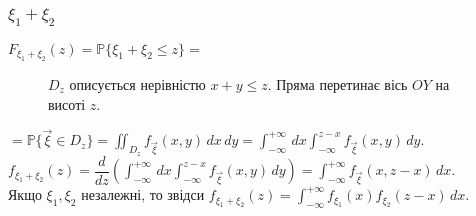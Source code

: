 \documentclass[a4paper, 10pt]{article}
\theoremstyle{theoremdd}
\begin{document}
\subsubsection{$\xi_1+\xi_2$}
$F_{\xi_1+\xi_2}(z) = \mathbb{P}\{\xi_1+\xi_2 \leq z\} =$
\begin{figure}[H]
\centering
{}
\caption*{$D_z$ описується нерівністю $x+y \leq z$. Пряма перетинає вісь $OY$ на висоті $z$.}
\end{figure}
\noindent
$= \mathbb{P}\{\vec{\xi} \in D_z\} = \displaystyle\iint_{D_z} f_{\vec{\xi}}(x,y)\,dx\,dy = \int_{-\infty}^{+\infty}\,dx \int_{-\infty}^{z-x} f_{\vec{\xi}}(x,y)\,dy$.\\
$f_{\xi_1+\xi_2}(z) = \displaystyle\dfrac{d}{d z} \left( \int_{-\infty}^{+\infty}\,dx \int_{-\infty}^{z-x} f_{\vec{\xi}}(x,y)\,dy \right) = \int_{-\infty}^{+\infty} f_{\vec{\xi}}(x,z-x)\,dx$.\\
Якщо $\xi_1,\xi_2$ незалежні, то звідси $f_{\xi_1+\xi_2}(z) = \displaystyle\int_{-\infty}^{+\infty} f_{\xi_1}(x) f_{\xi_2}(z-x)\,dx$.
\end{document}
